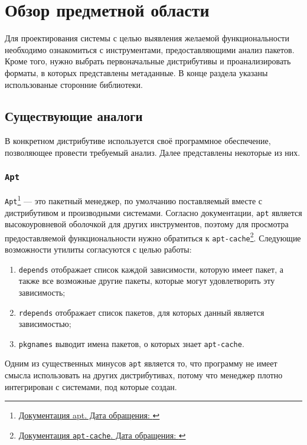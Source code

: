 
\section{Обзор предметной области}
\label{sec:relatedworks}
Для проектирования системы с целью выявления желаемой функциональности необходимо ознакомиться с инструментами, предоставляющими анализ пакетов.
Кроме того, нужно выбрать первоначальные дистрибутивы и проанализировать форматы, в которых представлены метаданные. В конце раздела указаны использованые сторонние библиотеки.

\subsection{Существующие аналоги}
В конкретном дистрибутиве используется своё программное обеспечение, позволяющее провести требуемый анализ.
Далее представлены некоторые из них.

\subsubsection{\texttt{Apt}}
\texttt{Apt}\footnote{\href{https://manpages.debian.org/stretch/apt/apt.8.en.html\#SCRIPT_USAGE_AND_DIFFERENCES_FROM_OTHER_APT_TOOLS/}{Документация apt. Дата обращения: }} --- это пакетный менеджер, по умолчанию поставляемый вместе с дистрибутивом {\debian} и производными системами.
Согласно документации, \texttt{apt} является высокоуровневой оболочкой для других инструментов, поэтому для просмотра предоставляемой функциональности нужно обратиться к \texttt{apt-cache}\footnote{\href{https://manpages.debian.org/stretch/apt/apt-cache.8.en.html}{Документация \texttt{apt-cache}. Дата обращения: }}.
Следующие возможности утилиты согласуются с целью работы:
\begin{enumerate}
	\item \texttt{depends} отображает список каждой зависимости, которую имеет пакет, а также все возможные другие пакеты, которые могут удовлетворить эту зависимость;
	\item \texttt{rdepends} отображает список пакетов, для которых данный является зависимостью;
	\item \texttt{pkgnames} выводит имена пакетов, о которых знает \texttt{apt-cache}.
\end{enumerate}

Одним из существенных минусов \texttt{apt} является то, что программу не имеет смысла использовать на других дистрибутивах, потому что менеджер плотно интегрирован с системами, под которые создан.

